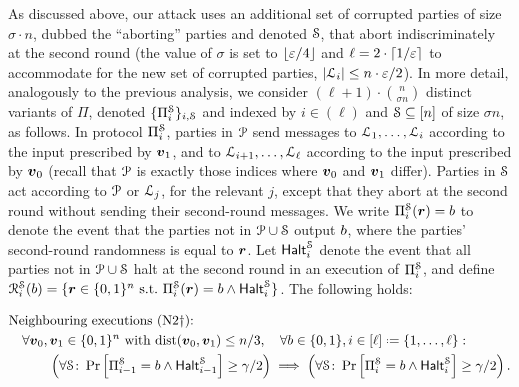 As discussed above, our attack uses an additional set of corrupted parties of size $\sigma\cdot n$, dubbed the ``aborting'' parties and denoted $\mathcal{S}$, that abort indiscriminately at the second round (the value of $\sigma$ is set to $\lfloor \varepsilon/4 \rfloor$ and $\ell=2\cdot \lceil1/\varepsilon\rceil$ to accommodate for the new set of corrupted parties, \ie $\left|{\cal{L}}_i\right|\le n\cdot \varepsilon /2$). In more detail, analogously to the previous analysis, we consider $(\ell+1)\cdot \binom{n}{\sigma n}$ distinct variants of $\Pi$, denoted $\{\Pi^{\mathcal{S}}_i\}_{i,\mathcal{S}}$ and indexed by $i\in (\ell)$ and $\mathcal{S} \subseteq[n]$ of size $\sigma n$, as follows. In protocol $\Pi_i^{\mathcal{S}}$, parties in $\mathcal{P}$ send messages to ${\cal{L}}_1,\ldots, {\cal{L}}_i$ according to the input prescribed by ${ \boldsymbol{v}}_1$, and to ${\cal{L}}_{i+1},\ldots, {\cal{L}}_\ell$ according to the input prescribed by ${ \boldsymbol{v}}_0$ (recall that $\mathcal{P}$ is exactly those indices where ${ \boldsymbol{v}}_0$ and ${ \boldsymbol{v}}_1$ differ). Parties in $\mathcal{S}$ act according to $\mathcal{P}$ or ${\cal{L}}_j$, for the relevant $j$, except that they abort at the second round without sending their second-round messages. We write $\Pi^{\mathcal{S}}_i({ \boldsymbol{r}})=b$ to denote the event that the parties not in $\mathcal{P}\cup \mathcal{S}$ output $b$, where the parties' second-round randomness is equal to ${ \boldsymbol{r}}$. Let $\mathsf{Halt}^{\mathcal{S}}_i$ denote the event that all parties not in $\mathcal{P}\cup \mathcal{S}$ halt at the second round in an execution of $\Pi^{\mathcal{S}}_i$, and define $\mathcal{R}_{i }^{\mathcal{S}}(b)=\{{ \boldsymbol{r}}\in {\{0,1\}^n}\text{ s.t.\ } \Pi^{\mathcal{S}}_i({ \boldsymbol{r}})=b \land \mathsf{Halt}^{\mathcal{S}}_i\}$. The following holds:

\begin{align}\label{eq:nei3}
&\text{Neighbouring executions (N2$\dagger$):}\\
&\quad \forall \vz,\vo \in \zn \text{ with } \ham(\vz,\vo)\le n/3, \quad \forall \o\in \zo,i\in [\ell] \assign \set{1,\ldots,\ell}\colon\nonumber\\
&\qquad\quad \left (\forall \cS\colon \pr{\Pi^\cS_{i-1}=\o \land \halt^{\cS}_{i-1}} \ge \gamma/2 \right) \implies \left(\forall \cS\colon\pr{\Pi^\cS_{i}=\o \land \halt^{\cS}_{i}}\ge \gamma/2\right). \nonumber
\end{align}

